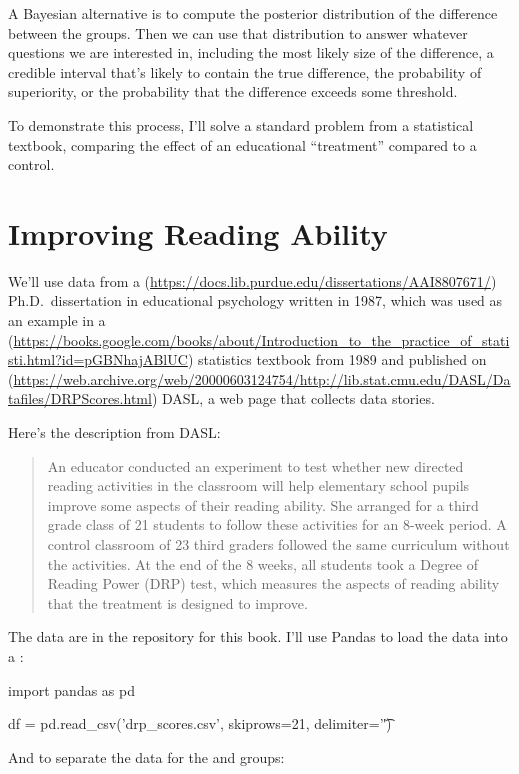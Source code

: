 \documentclass[12pt]{book}
\theoremstyle{exercise}
\begin{document}
A Bayesian alternative is to compute the posterior distribution of the
difference between the groups. Then we can use that distribution to
answer whatever questions we are interested in, including the most
likely size of the difference, a credible interval that's likely to
contain the true difference, the probability of superiority, or the
probability that the difference exceeds some threshold.

To demonstrate this process, I'll solve a standard problem from a
statistical textbook, comparing the effect of an educational
``treatment'' compared to a control.

\section{Improving Reading Ability}

We'll use data from a
(\url{https://docs.lib.purdue.edu/dissertations/AAI8807671/})
Ph.D.~dissertation in educational psychology written in 1987, which was used as an example
in a
(\url{https://books.google.com/books/about/Introduction_to_the_practice_of_statisti.html?id=pGBNhajABlUC})
statistics textbook from 1989 and published on
(\url{https://web.archive.org/web/20000603124754/http://lib.stat.cmu.edu/DASL/Datafiles/DRPScores.html}) DASL,
a web page that collects data stories.

Here's the description from DASL:

\begin{quote}
An educator conducted an experiment to test whether new directed reading
activities in the classroom will help elementary school pupils improve
some aspects of their reading ability. She arranged for a third grade
class of 21 students to follow these activities for an 8-week period. A
control classroom of 23 third graders followed the same curriculum
without the activities. At the end of the 8 weeks, all students took a
Degree of Reading Power (DRP) test, which measures the aspects of
reading ability that the treatment is designed to improve.
\end{quote}

The data are in the repository for this book.
I'll use Pandas to load the data into a :

\begin{code}
import pandas as pd

df = pd.read_csv('drp_scores.csv', skiprows=21, delimiter='\t')
\end{code}

And  to separate the data for the
 and 
groups:
\end{document}

